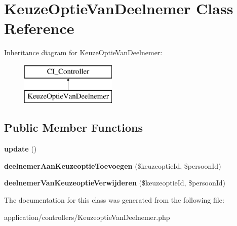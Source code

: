 \hypertarget{class_keuze_optie_van_deelnemer}{}\section{Keuze\+Optie\+Van\+Deelnemer Class Reference}
\label{class_keuze_optie_van_deelnemer}
Inheritance diagram for Keuze\+Optie\+Van\+Deelnemer\+:\begin{figure}[H]
\begin{center}
\leavevmode
\includegraphics[height=2.000000cm]{class_keuze_optie_van_deelnemer}
\end{center}
\end{figure}
\subsection*{Public Member Functions}
\begin{DoxyCompactItemize}
\item 
\mbox{\label{class_keuze_optie_van_deelnemer_a842e4774e3b3601a005b995c02f7e883}} 
{\bfseries update} ()
\item 
\mbox{\label{class_keuze_optie_van_deelnemer_a91e074d113aa641d9ca370800ca92e4b}} 
{\bfseries deelnemer\+Aan\+Keuzeoptie\+Toevoegen} (\$keuzeoptie\+Id, \$persoon\+Id)
\item 
\mbox{\label{class_keuze_optie_van_deelnemer_a2bcf529c0ac99ca060c6dba345110341}} 
{\bfseries deelnemer\+Van\+Keuzeoptie\+Verwijderen} (\$keuzeoptie\+Id, \$persoon\+Id)
\end{DoxyCompactItemize}


The documentation for this class was generated from the following file\+:\begin{DoxyCompactItemize}
\item 
application/controllers/Keuzeoptie\+Van\+Deelnemer.\+php\end{DoxyCompactItemize}
